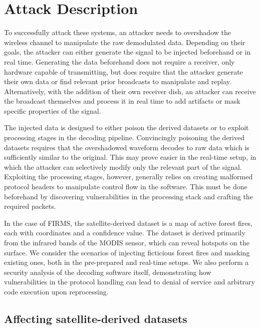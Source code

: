 \section{Attack Description}\label{sec:attack}

To successfully attack these systems, an attacker needs to overshadow the wireless channel to manipulate the raw demodulated data.
Depending on their goals, the attacker can either generate the signal to be injected beforehand or in real time.
Generating the data beforehand does not require a receiver, only hardware capable of transmitting, but does require that the attacker generate their own data or find relevant prior broadcasts to manipulate and replay.
Alternatively, with the addition of their own receiver dish, an attacker can receive the broadcast themselves and process it in real time to add artifacts or mask specific properties of the signal.

The injected data is designed to either poison the derived datasets or to exploit processing stages in the decoding pipeline.
Convincingly poisoning the derived datasets requires that the overshadowed waveform decodes to raw data which is sufficiently similar to the original.
This may prove easier in the real-time setup, in which the attacker can selectively modify only the relevant part of the signal.
Exploiting the processing stages, however, generally relies on creating malformed protocol headers to manipulate control flow in the software.
This must be done beforehand by discovering vulnerabilities in the processing stack and crafting the required packets.

In the case of FIRMS, the satellite-derived dataset is a map of active forest fires, each with coordinates and a confidence value.
The dataset is derived primarily from the infrared bands of the MODIS sensor, which can reveal hotspots on the surface.
We consider the scenarios of injecting ficticious forest fires and masking existing ones, both in the pre-prepared and real-time setups.
We also perform a security analysis of the decoding software itself, demonstrating how vulnerabilities in the protocol handling can lead to denial of service and arbitrary code execution upon reprocessing.

\subsection{Affecting satellite-derived datasets}

